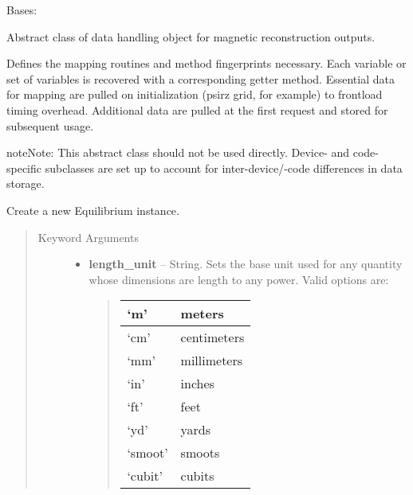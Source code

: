 \documentclass[letterpaper,10pt,english]{sphinxmanual}
\begin{document}
\begin{fulllineitems}
\label{eqtools:eqtools.core.Equilibrium}
Bases: 

Abstract class of data handling object for magnetic reconstruction outputs.

Defines the mapping routines and method fingerprints necessary.
Each variable or set of variables is recovered with a corresponding
getter method. Essential data for mapping are pulled on initialization
(psirz grid, for example) to frontload timing overhead. Additional data
are pulled at the first request and stored for subsequent usage.

\begin{notice}{note}{Note:}
This abstract class should not be used directly. Device- and code-
specific subclasses are set up to account for inter-device/-code differences
in data storage.
\end{notice}

Create a new Equilibrium instance.
\begin{quote}\begin{description}
\item[{Keyword Arguments}] \leavevmode\begin{itemize}
\item {} 
\textbf{length\_unit} --
String.
Sets the base unit used for any quantity whose
dimensions are length to any power. Valid options are:
\begin{quote}

\begin{tabulary}{\linewidth}{|L|L|}
\hline

`m'
 & 
meters
\\\hline

`cm'
 & 
centimeters
\\\hline

`mm'
 & 
millimeters
\\\hline

`in'
 & 
inches
\\\hline

`ft'
 & 
feet
\\\hline

`yd'
 & 
yards
\\\hline

`smoot'
 & 
smoots
\\\hline

`cubit'
 & 
cubits
\\\hline


\end{tabulary}
\end{quote}
\end{itemize}
\end{description}
\end{quote}
\end{fulllineitems}
\end{document}
